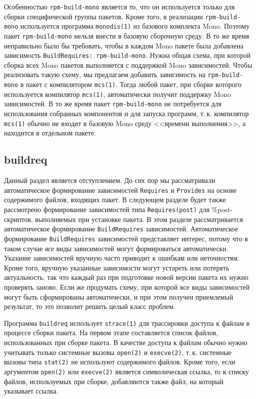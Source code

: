 \documentclass[russian,a4paper,12pt,titlepage]{article}
\begin{document}
Особенностью \verb|rpm-build-mono| является то, что он используется только для сборки специфической группы
пакетов.  Кроме того, в реализации \verb|rpm-build-mono| используется программа \verb|monodis(1)| из базового
комплекта Mono.  Поэтому пакет \verb|rpm-build-mono| нельзя внести в базовую сборочную среду.  В то же время
неправильно было бы требовать, чтобы в каждом Mono пакете была добавлена зависимость \texttt{BuildRequires: rpm-build-mono}.
Нужна общая схема, при которой сборка всех Mono пакетов выполняется с поддержкой Mono зависимостей.
Чтобы реализовать такую схему, мы предлагаем добавить зависимость на \verb|rpm-build-mono| в пакет
с компилятором \verb|mcs(1)|.  Тогда любой пакет, при сборке которого используется компилятор \verb|mcs(1)|,
автоматически получит поддержку Mono зависимостей.  В то же время пакет \verb|rpm-build-mono| не потребуется
для использования собранных компонентов и для запуска программ, т.\,к. компилятор \verb|mcs(1)| обычно
не входит в базовую Mono среду <<времени выполнения>>, а находится в отдельном пакете.

\subsection{buildreq}
Данный раздел является отступлением.  До сих пор мы рассматривали автоматическое формирование
зависимостей \verb|Requires| и \verb|Provides| на основе содержимого файлов, входящих пакет.
В следующем разделе будет также рассмотрено формирование зависимостей типа \verb|Requires(post)|
для \%post-скриптов, выполняемых при установке пакета.  В этом разделе рассматривается автоматическое
формирование \verb|BuildRequires| зависимостей.  Автоматическое формирование \verb|BuildRequires|
зависимостей представляет интерес, потому что в таком случае \emph{все} виды зависимостей могут
формироваться автоматически.  Указание зависимостей вручную часто приводит к ошибкам или неточностям.
Кроме того, вручную указанные зависимости могут устареть или потерять актуальность, так что каждый
раз при подготовке новой версии пакета их нужно проверять заново.  Если же продумать схему, при которой
все виды зависимостей могут быть сформированы автоматически, и при этом получен приемлемый результат,
то это позволит решить целый класс проблем.

Программа \verb|buildreq| использует \verb|strace(1)| для трассировки доступа к файлам в процессе сборки пакета.
На первом этапе составляется список файлов, использованных при сборке пакета.
В качестве доступа к файлам обычно нужно учитывать только системные вызовы \verb|open(2)| и \verb|execve(2)|,
т.\,к. системные вызовы типа \verb|stat(2)| не используют содержимого файлов.  Кроме того, если аргументом
\verb|open(2)| или \verb|execve(2)| является символическая ссылка, то к списку файлов, используемых при сборке,
добавляются также файл, на который указывает ссылка.
\end{document}
